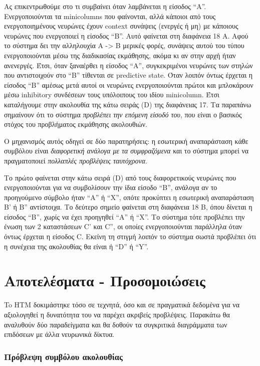 Ας επικεντρωθούμε στο τι συμβαίνει όταν λαμβάνεται η είσοδος ``A''.
Ενεργοποιούνται τα minicolumns που φαίνονται, αλλά κάποιοι από τους ενεργοποιημένους νευρώνες έχουν context συνάψεις (ενεργές ή μη) με κάποιους νευρώνες που ενεργοποιεί η είσοδος ``B''.
Αυτό φαίνεται στη διαφάνεια 18 Α.
Αφού το σύστημα δει την αλληλουχία A -> B μερικές φορές, συνάψεις αυτού του τύπου ενεργοποιούνται μέσω της διαδικασίας εκμάθησης, ακόμα κι αν στην αρχή ήταν ανενεργές.
Έτσι, όταν ξαναέρθει η είσοδος ``A'', συγκεκριμένοι νευρώνες των στηλών που αντιστοιχούν στο ``B'' τίθενται σε predictive state.
Όταν λοιπόν όντως έρχεται η είσοδος ``B'' αμέσως μετά αυτοί οι νευρώνες ενεργοποιούνται πρώτοι και μπλοκάρουν μέσω inhibitory συνδέσεων τους υπόλοιπους του ιδίου minicolumn.
Έτσι καταλήγουμε στην ακολουθία της κάτω σειράς (D) της διαφάνειας 17.
Τα παραπάνω σημαίνουν ότι το σύστημα \emph{προβλέπει την επόμενη είσοδό του}, που είναι ο βασικός στόχος του προβλήματος εκμάθησης ακολουθιών.

Ο μηχανισμός αυτός οδηγεί σε δύο παρατηρήσεις: η εσωτερική αναπαράσταση κάθε συμβόλου είναι \emph{διαφορετική ανάλογα με τα συμφραζόμενα} και το σύστημα μπορεί να πραγματοποιεί \emph{πολλαπλές προβλέψεις ταυτόχρονα}.

Το πρώτο φαίνεται στην κάτω σειρά (D) από τους διαφορετικούς νευρώνες που ενεργοποιούνται για να συμβολίσουν την ίδια είσοδο ``B'', ανάλογα αν το προηγούμενο σύμβολο ήταν ``A'' ή ``X'', οπότε προκύπτει η εσωτερική αναπαράσταση B' ή B'' αντίστοιχα.
Το δεύτερο σημείο φαίνεται στη διαφάνεια 18 Β, όπου δίνεται η είσοδος ``B'', χωρίς να έχει προηγηθεί ``Α'' ή ``Χ''.
Το σύστημα τότε προβλέπει την ένωση των 2 καταστάσεων C' και C'', οι οποίες ενεργοποιούνται παράλληλα όταν όντως έρχεται η είσοδος C.
Εκείνη τη στιγμή λοιπόν το σύστημα σωστά προβλέπει ότι η συνέχεια της ακολουθίας θα είναι ή ``D'' ή ``Y''.

\section{Αποτελέσματα - Προσομοιώσεις}

To ΗΤΜ δοκιμάστηκε τόσο σε τεχνητά, όσο και σε πραγματικά δεδομένα για να αξιολογηθεί η δυνατότητα του να παρέχει ακριβείς προβλέψεις.
Παρακάτω θα αναλυθούν δύο παραδείγματα και θα δοθούν τα συγκριτικά διαγράμματα των επιδόσεων με άλλα νευρωνικά δίκτυα.

\subsubsection{Πρόβλεψη συμβόλου ακολουθίας}

